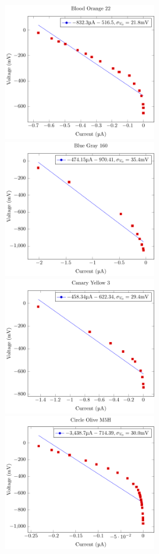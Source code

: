 \documentclass[a4paper]{article}
\begin{document}
\includegraphics[width=0.5\textwidth]{P1-PlanksConstant/Plots/BloodOrange22/bloodOrange22.pdf}
\includegraphics[width=0.5\textwidth]{P1-PlanksConstant/Plots/BlueGray160/blueGray160.pdf}
\includegraphics[width=0.5\textwidth]{P1-PlanksConstant/Plots/CanaryYellow3/canaryYellow3.pdf}
\includegraphics[width=0.5\textwidth]{P1-PlanksConstant/Plots/CircleOliveM5H/circleOliveM5H.pdf}
\end{document}
